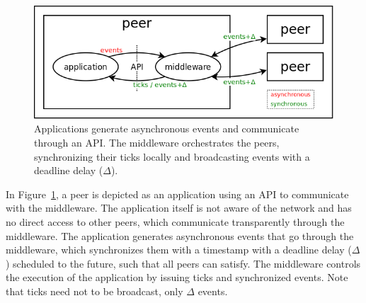 \documentclass[12pt]{article}
\begin{document}
\begin{figure}
  \centering
  \includegraphics[width=0.75\linewidth]{middleware}
  \caption{
    Applications generate asynchronous events and communicate through an API.
    The middleware orchestrates the peers, synchronizing their ticks locally
    and broadcasting events with a deadline delay ($\Delta$).
    \label{fig.middleware}
  }
\end{figure}

In Figure~\ref{fig.middleware}, a peer is depicted as an application using an
API to communicate with the middleware.
The application itself is not aware of the network and has no direct access to
other peers, which communicate transparently through the middleware.
The application generates asynchronous events that go through the middleware,
which synchronizes them with a timestamp with a deadline delay ($\Delta$)
scheduled to the future, such that all peers can satisfy.
The middleware controls the execution of the application by issuing ticks and
synchronized events.
Note that ticks need not to be broadcast, only $\Delta$ events.
\end{document}
